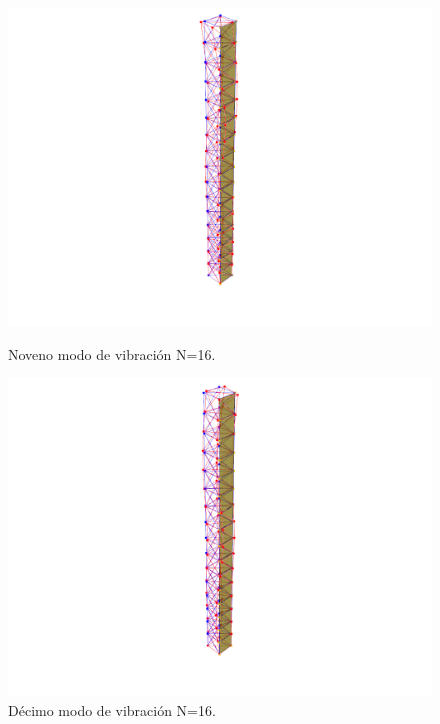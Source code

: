 \begin{figure}[H]
    \begin{minipage}[b]{0.5\textwidth}
        \centering
        \includegraphics[width=\textwidth]{FOTOS/mod9_16.png}
        \caption{Noveno modo de vibración N=16.}
    \end{minipage}
    \hfill
    \begin{minipage}[b]{0.5\textwidth}
        \centering
        \includegraphics[width=\textwidth]{FOTOS/mod10_16.png}
        \caption{Décimo modo de vibración N=16.}
    \end{minipage}
\end{figure}

\newpage

